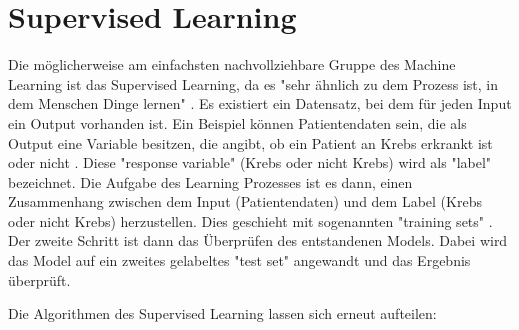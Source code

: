 \section{Supervised Learning}\label{subsec:sl}
Die möglicherweise am einfachsten nachvollziehbare Gruppe des Machine Learning ist das Supervised Learning, da es "sehr ähnlich zu dem Prozess ist, in dem Menschen Dinge lernen" \citep[S.~13; eigene Übersetzung]{kim_matlab_2017}. Es existiert ein Datensatz, bei dem für jeden Input ein Output vorhanden ist. Ein Beispiel können Patientendaten sein, die als Output eine Variable besitzen, die angibt, ob ein Patient an Krebs erkrankt ist oder nicht \citep[S.~222]{ramasubramanian_machine_2017}. Diese "response variable" (Krebs oder nicht Krebs) wird als "label" \citep[S.~222]{ramasubramanian_machine_2017} bezeichnet. Die Aufgabe des Learning Prozesses ist es dann, einen Zusammenhang zwischen dem Input (Patientendaten) und dem Label (Krebs oder nicht Krebs) herzustellen. Dies geschieht mit sogenannten "training sets" \citep[S.~5]{paluszek_matlab_2017}. Der zweite Schritt ist dann das Überprüfen des entstandenen Models. Dabei wird das Model auf ein zweites gelabeltes "test set" \citep[S.~5]{paluszek_matlab_2017} angewandt und das Ergebnis überprüft.\par
Die Algorithmen des Supervised Learning lassen sich erneut aufteilen:

